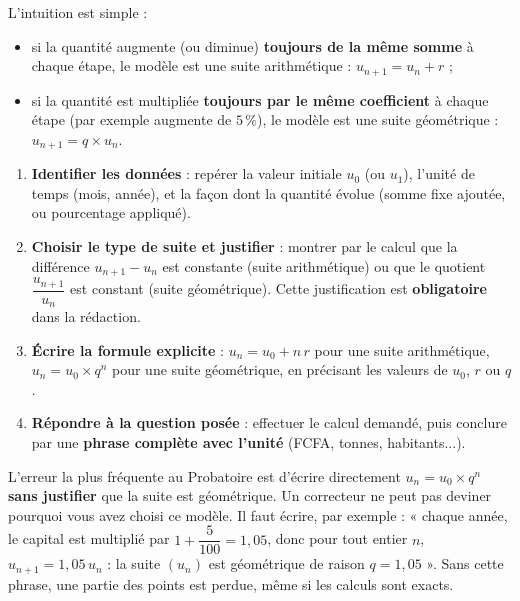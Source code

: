 \documentclass[11pt]{article}
\newcommand{\cle}[1]{{\popxbold\color{popdark}#1}}
\begin{document}
L'intuition est simple :
\begin{itemize}
\item si la quantité augmente (ou diminue) \textbf{toujours de la même somme} à chaque étape, le modèle est une \cle{suite arithmétique} : $u_{n+1} = u_n + r$ ;
\item si la quantité est multipliée \textbf{toujours par le même coefficient} à chaque étape (par exemple augmente de $5\,\%$), le modèle est une \cle{suite géométrique} : $u_{n+1} = q \times u_n$.
\end{itemize}

\begin{methode}
\begin{enumerate}
\item \textbf{Identifier les données} : repérer la valeur initiale $u_0$ (ou $u_1$), l'unité de temps (mois, année), et la façon dont la quantité évolue (somme fixe ajoutée, ou pourcentage appliqué).
\item \textbf{Choisir le type de suite et justifier} : montrer par le calcul que la différence $u_{n+1}-u_n$ est constante (suite arithmétique) ou que le quotient $\dfrac{u_{n+1}}{u_n}$ est constant (suite géométrique). Cette justification est \textbf{obligatoire} dans la rédaction.
\item \textbf{Écrire la formule explicite} : $u_n = u_0 + n\,r$ pour une suite arithmétique, $u_n = u_0 \times q^n$ pour une suite géométrique, en précisant les valeurs de $u_0$, $r$ ou $q$.
\item \textbf{Répondre à la question posée} : effectuer le calcul demandé, puis conclure par une \textbf{phrase complète avec l'unité} (FCFA, tonnes, habitants...).
\end{enumerate}
\end{methode}

\begin{attention}
L'erreur la plus fréquente au Probatoire est d'écrire directement $u_n = u_0 \times q^n$ \textbf{sans justifier} que la suite est géométrique. Un correcteur ne peut pas deviner pourquoi vous avez choisi ce modèle. Il faut écrire, par exemple : « chaque année, le capital est multiplié par $1 + \dfrac{5}{100} = 1{,}05$, donc pour tout entier $n$, $u_{n+1} = 1{,}05\,u_n$ : la suite $(u_n)$ est géométrique de raison $q = 1{,}05$ ». Sans cette phrase, une partie des points est perdue, même si les calculs sont exacts.
\end{attention}
\end{document}
